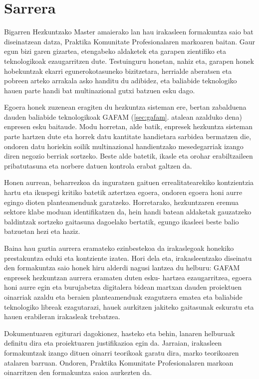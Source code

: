 \chapter{Sarrera}\label{cha:sarrera}
Bigarren Hezkuntzako Master amaierako lan hau irakasleen formakuntza saio bat diseinatzean datza, Praktika Komunitate Profesionalaren markoaren baitan. Gaur egun bizi garen gizartea, etengabeko aldaketek eta garapen zientifiko eta teknologikoak ezaugarritzen dute. Testuinguru honetan, nahiz eta, garapen honek hobekuntzak ekarri egunerokotasuneko bizitzetara, herrialde aberatsen eta pobreen arteko arrakala asko handitu du adibidez, eta baliabide teknologiko hauen parte handi bat multinazional gutxi batzuen esku dago.

Egoera honek zuzenean eragiten du hezkuntza sisteman ere, bertan zabalduena dauden baliabide teknologikoak GAFAM (\ref{sec:gafam}. atalean azalduko dena) enpresen esku baitaude. Modu horretan, alde batik, enpresek hezkuntza sisteman parte hartzen dute eta horrek datu kantitate handietara sarbidea bermatzen die, ondoren datu horiekin soilik multinazional handientzako mesedegarriak izango diren negozio berriak sortzeko. Beste alde batetik, ikasle eta orohar erabiltzaileen pribatutasuna eta norbere datuen kontrola erabat galtzen da.

Honen aurrean, beharrezkoa da inguratzen gaituen errealitatearekiko kontzientzia hartu eta ikuspegi kritiko batetik aztertzea egoera, ondoren egoera honi aurre egingo dioten planteamenduak garatzeko. Horretarako, hezkuntzaren eremua sektore klabe moduan identifikatzen da, hein handi batean aldaketak gauzatzeko baldintzak sortzeko gaitasuna dagoelako bertatik, egungo ikasleei beste balio batzuetan hezi eta haziz.

Baina hau guztia aurrera eramateko ezinbestekoa da irakaslegoak honekiko prestakuntza eduki eta kontziente izatea. Hori dela eta, irakasleentzako diseinatu den formakuntza saio honek hiru alderdi nagusi lantzea du helburu: GAFAM enpresek hezkuntzan aurrera eramaten duten esku- hartzea ezaugarritzea, egoera honi aurre egin eta burujabetza digitalera bidean martxan dauden proiektuen oinarriak azaldu eta beraien planteamenduak ezagutzera ematea eta baliabide teknologiko libreak ezagutarazi, hauek aurkitzen jakiteko gaitasunak eskuratu eta hauen erabileran irakasleak trebatzea.

Dokumentuaren egiturari dagokionez, hasteko eta behin, lanaren helburuak definitu dira eta proiektuaren justifikazioa egin da. Jarraian, irakasleen formakuntzak izango dituen oinarri teorikoak garatu dira, marko teorikoaren atalaren barruan. Ondoren, Praktika Komunitate Profesionalaren markoan oinarritzen den formakuntza saioa aurkezten da.

